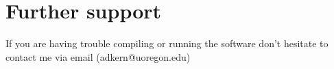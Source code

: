 \documentclass[12pt]{article}
\begin{document}
\section*{Further support}
If you are having trouble compiling or running the software don't hesitate to contact me via email (adkern@uoregon.edu)



\end{document}
